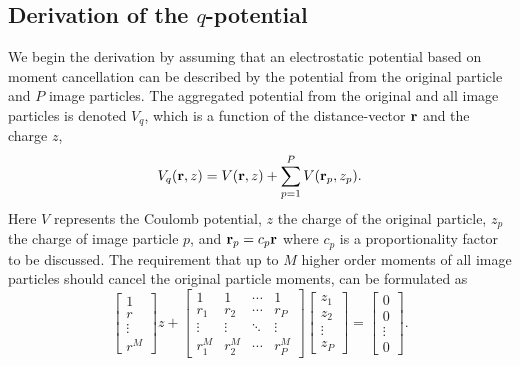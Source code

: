\documentclass[
journal=jctcce,
manuscript=letter]{achemso}
\begin{document}
\subsection{Derivation of the $q$-potential}\label{app:A}
We begin the derivation by assuming that an electrostatic potential based on moment cancellation can be described by the potential from the original particle and $P$ image particles. The aggregated potential from the original and all image particles is denoted $V_q$, which is a function of the distance-vector ${\bf r}$ and the charge $z$,
\begin{equation}
\label{eq:imag_pot}
V_{q}({\bf r},z) = V({\bf r},z) + \sum_{p=1}^P V({\bf r}_p,z_p).
\end{equation}
Here $V$ represents the Coulomb potential,
$z$ the charge of the original particle,
$z_p$ the charge of image particle $p$, and ${\bf r}_p = c_p{\bf r}$ where $c_p$ is a proportionality factor to be discussed.
The requirement that up to $M$ higher order moments of all image particles should cancel the original particle moments, can be formulated as
\begin{equation}
\label{eq:finalMatrix}
\begin{bmatrix}
       1    \\[0.3em]
       r  \\[0.3em]
       \vdots          \\[0.3em]
       r^{M}      
     \end{bmatrix}z + \begin{bmatrix}  
  1 & 1 & \cdots & 1 \\
  r_1 & r_2 & \cdots & r_P \\
  \vdots  & \vdots  & \ddots & \vdots  \\
  r_1^{M} & r_2^{M} & \cdots & r_P^{M}
     \end{bmatrix}
     \begin{bmatrix}
       z_{1}    \\[0.3em]
       z_{2}  \\[0.3em]
       \vdots          \\[0.3em]
       z_{P} 
     \end{bmatrix}
     = \begin{bmatrix}
       0    \\[0.3em]
       0  \\[0.3em]
       \vdots          \\[0.3em]
       0      
     \end{bmatrix}.
\end{equation}
\end{document}
